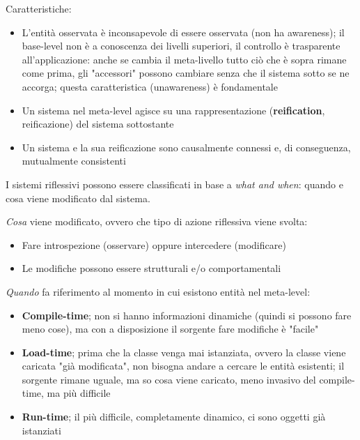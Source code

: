 Caratteristiche:
\begin{itemize}
	\item L'entità osservata è inconsapevole di essere osservata (non ha awareness); il base-level non è a conoscenza dei livelli superiori, il controllo è trasparente all'applicazione: anche se cambia il meta-livello tutto ciò che è sopra rimane come prima, gli "accessori" possono cambiare senza che il sistema sotto se ne accorga; questa caratteristica (unawareness) è fondamentale
	
	\item Un sistema nel meta-level agisce su una rappresentazione (\textbf{reification}, reificazione) del sistema sottostante
	
	\item Un sistema e la sua reificazione sono causalmente connessi e, di conseguenza, mutualmente consistenti
\end{itemize}

I sistemi riflessivi possono essere classificati in base a \textit{what and when}: quando e cosa viene modificato dal sistema.

\textit{Cosa} viene modificato, ovvero che tipo di azione riflessiva viene svolta:
\begin{itemize}
	\item Fare introspezione (osservare) oppure intercedere (modificare)
	
	\item Le modifiche possono essere strutturali e/o comportamentali
\end{itemize}

\textit{Quando} fa riferimento al momento in cui esistono entità nel meta-level:
\begin{itemize}
	\item \textbf{Compile-time}; non si hanno informazioni dinamiche (quindi si possono fare meno cose), ma con a disposizione il sorgente fare modifiche è "facile"
	
	\item \textbf{Load-time}; prima che la classe venga mai istanziata, ovvero la classe viene caricata "già modificata", non bisogna andare a cercare le entità esistenti; il sorgente rimane uguale, ma so cosa viene caricato, meno invasivo del compile-time, ma più difficile
	
	\item \textbf{Run-time}; il più difficile, completamente dinamico, ci sono oggetti già istanziati
\end{itemize}

